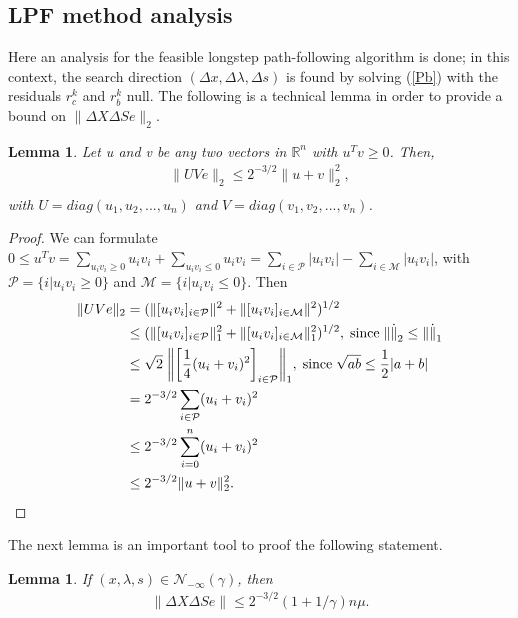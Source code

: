 \documentclass[a4paper,10 pt,titlepage,twoside]{book}
\theoremstyle{plain}
\newtheorem{lem}[thm]{Lemma}
\theoremstyle{definition}
\theoremstyle{remark}
\begin{document}
\subsection{LPF method analysis}
Here an analysis for the feasible longstep path-following algorithm is done; in this context, the search direction $(\Delta x, \Delta \lambda, \Delta s)$ is found by solving (\ref{Pb}) with the residuals $r_{c}^{k}$ and $r_{b}^{k}$ null.
The following is a technical lemma in order to provide a bound on $\lVert\Delta X\Delta S e\rVert_{2}$.
\begin{lem}\label{lem1}
	Let u and v be any two vectors in $\mathbb{R}^{n}$ with $u^{T}v \geq 0$. Then, 
	\begin{align*}
	\lVert UVe \rVert_{2}\leq 2^{-3/2}\lVert u + v \rVert^{2}_{2},\\
	\end{align*}
	with $U = diag(u_{1}, u_{2}, ..., u_{n})$ and $V = diag(v_{1}, v_{2}, ..., v_{n})$. 
\end{lem}
\begin{proof}
	We can formulate $0 \leq u^{T}v = \sum\limits_{u_{i}v_{i} \geq 0}u_{i}v_{i} + \sum\limits_{u_{i}v_{i} \leq 0}u_{i}v_{i} = \sum\limits_{i \in \mathcal{P}}|u_{i}v_{i}| - \sum\limits_{i \in \mathcal{M}}|u_{i}v_{i}| $, with $\mathcal{P}= \{i | u_{i}v_{i} \geq 0\}$ and $\mathcal{M}= \{i | u_{i}v_{i} \leq 0\}$.
	Then
	\begin{align*}
	\lVert UVe \rVert_{2} &= ( \lVert[u_{i}v_{i}]_{i \in \mathcal{P}} \rVert^{2} +  \lVert[u_{i}v_{i}]_{i \in \mathcal{M}} \rVert^{2})^{1/2}\\
	&\leq ( \lVert[u_{i}v_{i}]_{i \in \mathcal{P}} \rVert^{2}_{1} +  \lVert[u_{i}v_{i}]_{i \in \mathcal{M}} \rVert^{2}_{1})^{1/2},\; \text{since\;} \lVert\dot\rVert_{2} \leq \lVert\dot\rVert_{1}\\
	&\leq\sqrt{2}\;\bigg\lVert\bigg[\frac{1}{4}(u_{i} + v_{i})^{2}\bigg]_{i\in \mathcal{P}}\bigg\rVert_{1}, \text{\;since\;} \sqrt{ab} \leq \frac{1}{2}|a+b|\\
	& = 2^{-3/2} \sum\limits_{i \in \mathcal{P}}(u_{i} + v_{i})^{2}\\
	& \leq 2^{-3/2} \sum\limits_{i = 0}^{n}(u_{i} + v_{i})^{2}\\
	& \leq 2^{-3/2} \lVert u + v \rVert^{2}_{2}.
	\end{align*}
\end{proof}	
The next lemma is an important tool to proof the following statement.
\begin{lem}\label{lem:ma1}
	If $(x, \lambda, s) \in \mathcal{N}_{-\infty}(\gamma)$, then
	\begin{align*}
	\lVert\Delta X\Delta S e \rVert \leq 2^{-3/2}(1 + 1/ \gamma)n\mu.\\
	\end{align*}
\end{lem}
\end{document}
